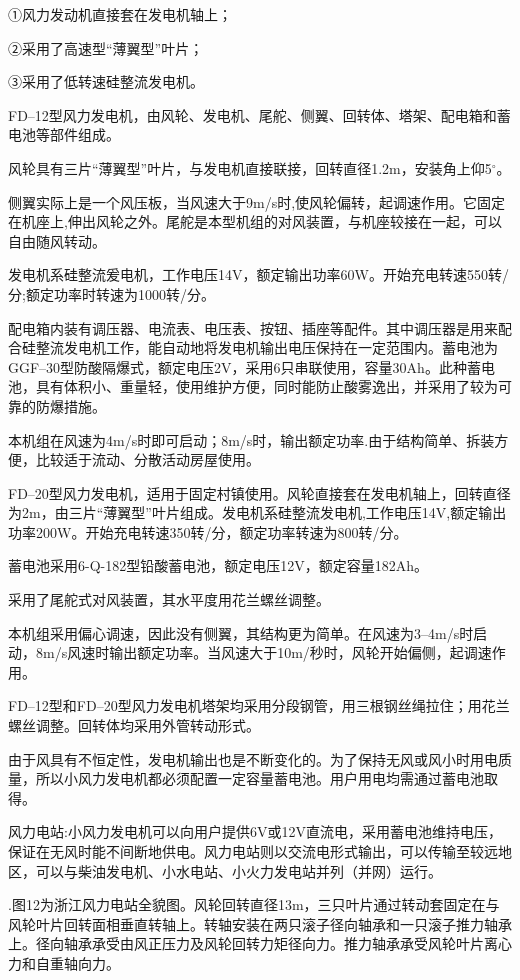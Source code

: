 \documentclass{ctexbook}
\begin{document}
①风力发动机直接套在发电机轴上；

②采用了高速型“薄翼型”叶片；

③采用了低转速硅整流发电机。

FD--12型风力发电机，由风轮、发电机、尾舵、侧翼、回转体、塔架、配电箱和蓄电池等部件组成。

风轮具有三片“薄翼型”叶片，与发电机直接联接，回转直径1.2m，安装角上仰5$^{\circ}$。

侧翼实际上是一个风压板，当风速大于9m/s时,使风轮偏转，起调速作用。它固定在机座上,伸出风轮之外。尾舵是本型机组的对风装置，与机座较接在一起，可以自由随风转动。

发电机系硅整流爰电机，工作电压14V，额定输出功率60W。开始充电转速550转/分;额定功率时转速为1000转/分。

配电箱内装有调压器、电流表、电压表、按钮、插座等配件。其中调压器是用来配合硅整流发电机工作，能自动地将发电机输出电压保持在一定范围内。蓄电池为GGF--30型防酸隔爆式，额定电压2V，采用6只串联使用，容量30Ah。此种蓄电池，具有体积小、重量轻，使用维护方便，同时能防止酸雾逸出，并采用了较为可靠的防爆措施。

本机组在风速为4m/s时即可启动；8m/s时，输出额定功率.由于结构简单、拆装方便，比较适于流动、分散活动房屋使用。

FD--20型风力发电机，适用于固定村镇使用。风轮直接套在发电机轴上，回转直径为2m，由三片“薄翼型”叶片组成。发电机系硅整流发电机,工作电压14V,额定输出功率200W。开始充电转速350转/分，额定功率转速为800转/分。

蓄电池采用6-Q-182型铅酸蓄电池，额定电压12V，额定容量182Ah。

采用了尾舵式对风装置，其水平度用花兰螺丝调整。

本机组采用偏心调速，因此没有侧翼，其结构更为简单。在风速为3--4m/s时启动，8m/s风速时输出额定功率。当风速大于10m/秒时，风轮开始偏侧，起调速作用。	

FD--12型和FD--20型风力发电机塔架均采用分段钢管，用三根钢丝绳拉住；用花兰螺丝调整。回转体均采用外管转动形式。

由于风具有不恒定性，发电机输出也是不断变化的。为了保持无风或风小时用电质量，所以小风力发电机都必须配置一定容量蓄电池。用户用电均需通过蓄电池取得。

风力电站:小风力发电机可以向用户提供6V或12V直流电，采用蓄电池维持电压，保证在无风时能不间断地供电。风力电站则以交流电形式输出，可以传输至较远地区，可以与柴油发电机、小水电站、小火力发电站并列（并网）运行。

.图12为浙江风力电站全貌图。风轮回转直径13m，三只叶片通过转动套固定在与风轮叶片回转面相垂直转轴上。转轴安装在两只滚子径向轴承和一只滚子推力轴承上。径向轴承承受由风正压力及风轮回转力矩径向力。推力轴承承受风轮叶片离心力和自重轴向力。
\end{document}
